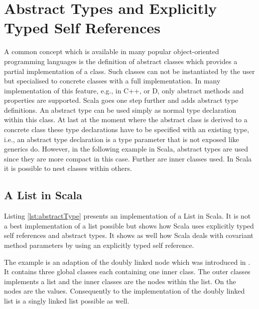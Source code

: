 \section{Abstract Types and Explicitly Typed Self References}
A common concept which is available in many popular object-oriented
programming languages is the definition of abstract classes which
provides a partial implementation of a class. Such classes can not be
instantiated by the user but specialised to concrete classes with a full
implementation.  In many implementation of this feature, e.g., in C++,
\cs or D, only abstract methods and properties are supported. Scala goes
one step further and adds abstract type definitions. An abstract type can
be used simply as normal type declaration within this class. At last at
the moment where the abstract class is derived to a concrete class these
type declarations have to be specified with an existing type, i.e.,
an abstract type declaration is a type parameter that is not exposed
like generics do. However, in the following example in Scala, abstract
types are used since they are more compact in this case. Further are
inner classes used. In Scala it is possible to nest classes within others.

\subsection{A List in Scala}
Listing \ref{lst:abstractType} presents an implementation of a List
in Scala.  It is not a best implementation of a list possible but shows
how Scala uses explicitly typed self references and abstract types. It
shows as well how Scala deals with covariant method parameters by using
an explicitly typed self reference.

The example is an adaption of the doubly linked node which was introduced
in . It contains three global classes each
containing one inner class. The outer classes implements a list and
the inner classes are the nodes within the list. On the nodes are the
values. Consequently to the implementation of the doubly linked list is
a singly linked list possible as well.


